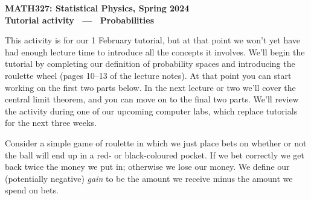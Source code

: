 \documentclass[12 pt]{article} %
\begin{document}
\newcommand{\thisunit}{MATH327 Tutorial (Probabilities)}
\newcommand{\moddate}{Last modified 1 Feb.~2024}
\begin{center}
  {\Large \textbf{MATH327: Statistical Physics, Spring 2024}} \\[12 pt]
  {\Large \textbf{Tutorial activity \ --- \ Probabilities}} \\[24 pt]
\end{center}

This activity is for our 1 February tutorial, but at that point we won't yet have had enough lecture time to introduce all the concepts it involves.
We'll begin the tutorial by completing our definition of probability spaces and introducing the roulette wheel (pages 10--13 of the lecture notes).
At that point you can start working on the first two parts below.
In the next lecture or two we'll cover the central limit theorem, and you can move on to the final two parts.
We'll review the activity during one of our upcoming computer labs, which replace tutorials for the next three weeks.

Consider a simple game of roulette in which we just place bets on whether or not the ball will end up in a red- or black-coloured pocket.
If we bet correctly we get back twice the money we put in; otherwise we lose our money.
We define our (potentially negative) \textit{gain} to be the amount we receive minus the amount we spend on bets.
\end{document}
